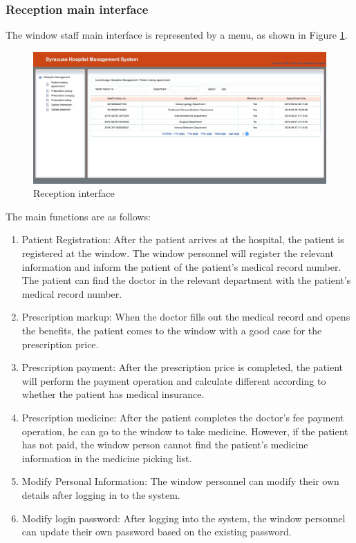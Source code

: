 \subsubsection{Reception main interface}
The window staff main interface is represented by a menu, as shown in Figure \ref{fig:p9}.
\begin{figure}[H]
    \centering
    \includegraphics[width=\textwidth]{9.png}
    \caption{Reception interface}
    \label{fig:p9}
\end{figure}
The main functions are as follows:
\begin{enumerate}
    \item Patient Registration: After the patient arrives at the hospital, the patient is registered at the window. The window personnel will register the relevant information and inform the patient of the patient's medical record number. The patient can find the doctor in the relevant department with the patient's medical record number.
    \item Prescription markup: When the doctor fills out the medical record and opens the benefits, the patient comes to the window with a good case for the prescription price.
    \item Prescription payment: After the prescription price is completed, the patient will perform the payment operation and calculate different according to whether the patient has medical insurance.
    \item Prescription medicine: After the patient completes the doctor's fee payment operation, he can go to the window to take medicine. However, if the patient has not paid, the window person cannot find the patient's medicine information in the medicine picking list.
    \item Modify Personal Information: The window personnel can modify their own details after logging in to the system.
    \item Modify login password: After logging into the system, the window personnel can update their own password based on the existing password.
\end{enumerate}

